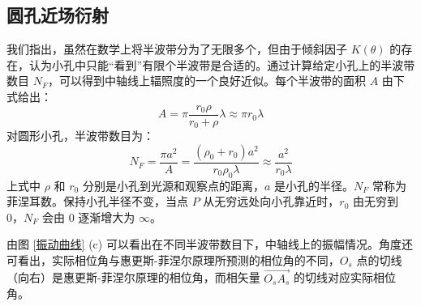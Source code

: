 \documentclass[UTF8]{report}
\theoremstyle{MyLineTheoremStyle} %
\theoremstyle{MyBlockTheoremStyle} %
\theoremstyle{MySubsubsectionStyle} %
\begin{document}
\subsection{圆孔近场衍射}

我们指出，虽然在数学上将半波带分为了无限多个，但由于倾斜因子 $K(\theta)$ 的存在，认为小孔中只能“看到”有限个半波带是合适的。通过计算给定小孔上的半波带数目 $N_F$，可以得到中轴线上辐照度的一个良好近似。每个半波带的面积 $A$ 由下式给出：
\begin{equation}
A = \pi \frac{r_0 \rho}{r_0 + \rho} \lambda \approx \pi r_0 \lambda
\end{equation}
对圆形小孔，半波带数目为：
\begin{equation}
N_F = \frac{\pi a^2}{A} = \frac{(\rho_0 + r_0)a^2 }{r_0 \rho_0 \lambda} \approx \frac{a^2}{ r_0 \lambda}
\end{equation}
上式中 $\rho$ 和 $r_0$ 分别是小孔到光源和观察点的距离，$a$ 是小孔的半径。$N_F$ 常称为菲涅耳数。保持小孔半径不变，当点 $P$ 从无穷远处向小孔靠近时，$r_0$ 由无穷到 0，$N_F$ 会由 $0$ 逐渐增大为 $\infty$。

由图 \ref{振动曲线} (c) 可以看出在不同半波带数目下，中轴线上的振幅情况。角度还可看出，实际相位角与惠更斯-菲涅尔原理所预测的相位角的不同，$O_s$ 点的切线（向右）是惠更斯-菲涅尔原理的相位角，而相矢量 $\overrightarrow{O_sA_s}$ 的切线对应实际相位角。
\end{document}
